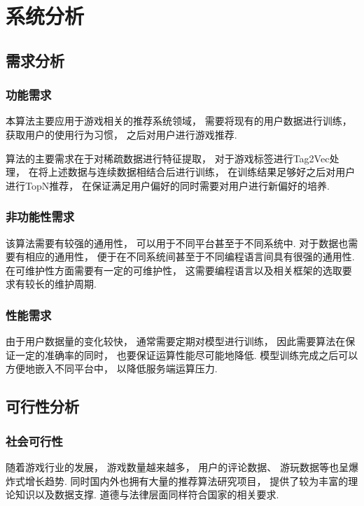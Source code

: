 \section{系统分析}

\subsection{需求分析}

\subsubsection{功能需求}

本算法主要应用于游戏相关的推荐系统领域，
需要将现有的用户数据进行训练，
获取用户的使用行为习惯，
之后对用户进行游戏推荐.

算法的主要需求在于对稀疏数据进行特征提取，
对于游戏标签进行Tag2Vec处理，
在将上述数据与连续数据相结合后进行训练，
在训练结果足够好之后对用户进行TopN推荐，
在保证满足用户偏好的同时需要对用户进行新偏好的培养.

\subsubsection{非功能性需求}

该算法需要有较强的通用性，
可以用于不同平台甚至于不同系统中.
对于数据也需要有相应的通用性，
便于在不同系统间甚至于不同编程语言间具有很强的通用性.
在可维护性方面需要有一定的可维护性，
这需要编程语言以及相关框架的选取要求有较长的维护周期.

\subsubsection{性能需求}

由于用户数据量的变化较快，
通常需要定期对模型进行训练，
因此需要算法在保证一定的准确率的同时，
也要保证运算性能尽可能地降低.
模型训练完成之后可以方便地嵌入不同平台中，
以降低服务端运算压力.

\subsection{可行性分析}

\subsubsection{社会可行性}

随着游戏行业的发展，
游戏数量越来越多，
用户的评论数据、
游玩数据等也呈爆炸式增长趋势.
同时国内外也拥有大量的推荐算法研究项目，
提供了较为丰富的理论知识以及数据支撑.
道德与法律层面同样符合国家的相关要求.

